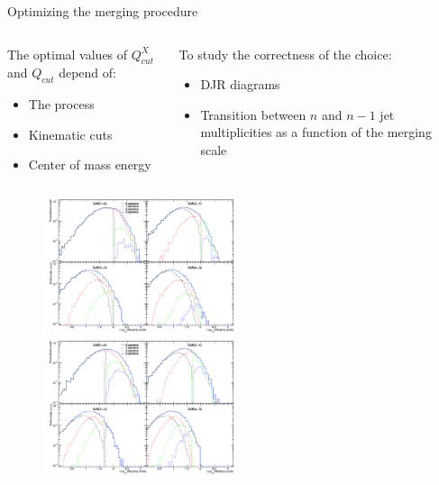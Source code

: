 \begin{frame}{Optimizing the merging procedure}
\vspace{-.2cm}
\begin{columns}
\begin{column}{.50\textwidth}
  \begin{block}{}\tiny
    The optimal values of $Q^{X}_{cut}$ and $Q_{cut}$ depend of:
    \begin{itemize}
    \item The process 
    \item Kinematic cuts
    \item Center of mass energy
    \end{itemize}
  \end{block}
\end{column}
\begin{column}{.50\textwidth}
  \begin{block}{}\tiny
    To study the correctness of the choice:
    \begin{itemize}
    \item DJR diagrams
    \item Transition between $n$ and $n-1$ jet multiplicities as a function of the merging scale
    \end{itemize}
  \end{block}
\end{column}
\end{columns}

\vspace{-.2cm}
\begin{figure}[!Hhtbp]
  \begin{center}
    \includegraphics[width=0.5\textwidth]{../figs/DJR_q100_xq20_TTJets13TeV.png}
    \includegraphics[width=0.5\textwidth]{../figs/DJR_q50_xq20_TTJets13TeV.png}
  \end{center}
\end{figure}


\end{frame}
